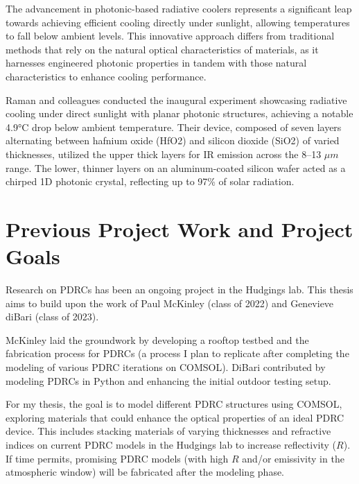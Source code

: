 The advancement in photonic-based radiative coolers represents a significant leap towards achieving efficient cooling directly under sunlight, allowing temperatures to fall below ambient levels. This innovative approach differs from traditional methods that rely on the natural optical characteristics of materials, as it harnesses engineered photonic properties in tandem with those natural characteristics to enhance cooling performance.

Raman and colleagues conducted the inaugural experiment showcasing radiative cooling under direct sunlight with planar photonic structures, achieving a notable 4.9°C drop below ambient temperature. Their device, composed of seven layers alternating between hafnium oxide (HfO2) and silicon dioxide (SiO2) of varied thicknesses, utilized the upper thick layers for IR emission across the 8–13 $\mu m$ range. The lower, thinner layers on an aluminum-coated silicon wafer acted as a chirped 1D photonic crystal, reflecting up to 97\% of solar radiation.



\section{Previous Project Work and Project Goals}
Research on PDRCs has been an ongoing project in the Hudgings lab. This thesis aims to build upon the work of Paul McKinley (class of 2022) and Genevieve diBari (class of 2023).

McKinley laid the groundwork by developing a rooftop testbed and the fabrication process for PDRCs (a process I plan to replicate after completing the modeling of various PDRC iterations on COMSOL). DiBari contributed by modeling PDRCs in Python and enhancing the initial outdoor testing setup.

For my thesis, the goal is to model different PDRC structures using COMSOL, exploring materials that could enhance the optical properties of an ideal PDRC device. This includes stacking materials of varying thicknesses and refractive indices on current PDRC models in the Hudgings lab to increase reflectivity ($R$). If time permits, promising PDRC models (with high $R$ and/or emissivity in the atmospheric window) will be fabricated after the modeling phase.
